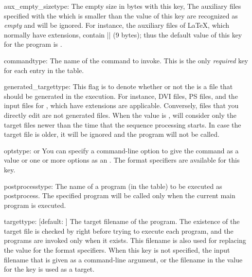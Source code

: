 \documentclass{llmk-doc}
\begin{document}
\begin{confkey}{aux\_empty\_size}{type: }
The empty size in bytes with this key, The auxiliary files specified with the
 which is smaller than the value of this key are recognized as
\emph{empty} and will be ignored. For instance, the auxiliary files of {\LaTeX},
which normally have  extensions, contain
|\textvisiblespace{}| (9 bytes); thus the default
value of this key for the  program is .
\end{confkey}

\begin{confkey}{command}{type: }
The name of the command to invoke. This is the only \emph{required} key for
each entry in the  table.
\end{confkey}

\begin{confkey}{generated\_target}{type: }
This flag is to denote whether or not the  is a file that should
be generated in the  execution. For instance, DVI files, PS files,
and the input files for , which have  extensions are
applicable. Conversely, files that you directly edit are not generated files.
When the value is ,  will consider only the target files
newer than the time that the sequence processing starts. In case the target
file is older, it will be ignored and the program will not be called.
\end{confkey}

\begin{confkey}{opts}{type:  or }
You can specify a command-line option to give the command as a 
value or one or more options as an . The format
specifiers are available for this key.
\end{confkey}

\begin{confkey}{postprocess}{type: }
The name of a program (in the  table) to be executed as
postprocess. The specified program will be called only when the current main
program is executed.
\end{confkey}

\begin{confkey}{target}{type: }[default: ]
The target filename of the program. The existence of the target file is checked
by  right before trying to execute each program, and the programs
are invoked only when it exists. This filename is also used for replacing the
value for the format specifiers. When this key is not specified, the input
filename that is given as a command-line argument, or the filename in the value
for the  key is used as a target.
\end{confkey}
\end{document}
